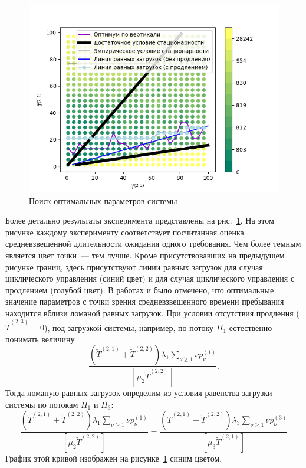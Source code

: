 \begin{figure}[h]
\centering
\includegraphics[scale=0.9]{Pictures/0_1_thres_10_target.png} 
\caption{Поиск оптимальных параметров системы}
\label{Experiment:targets}
\end{figure}


Более детально результаты эксперимента представлены на рис.~\ref{Experiment:targets}. На этом рисунке каждому эксперименту соответствует посчитанная оценка средневзвешенной длительности ожидания одного требования. Чем более темным является цвет точки~--- тем лучше. Кроме присутствовавших на предыдущем рисунке границ, здесь присутствуют линии равных загрузок для случая циклического управления (синий цвет) и для случая циклического управления с продлением (голубой цвет). В работах \cite{Fedotkin:2009} и \cite{FedotkinRachinskaya:2016} было отмечено, что оптимальные значение параметров с точки зрения средневзвешенного времени пребывания находится вблизи ломаной равных загрузок. При условии отсутствия продления ($\widetilde T^{(2,3)}=0$),  под загрузкой системы, например, по потоку $\Pi_1$ естественно понимать величину
\begin{equation}
\frac{(\widetilde T^{(2,1)} + \widetilde T^{(2,2)})\lambda_1 \sum_{\nu\geqslant 1}\nu p_{\nu}^{(1)}}{[\mu_2 \widetilde T^{(2,2)}]}.
\end{equation}
Тогда ломаную равных загрузок определим из условия равенства загрузки системы по потокам $\Pi_1$ и $\Pi_3$:
\begin{equation}
\frac{(\widetilde T^{(2,1)} +\widetilde T^{(2,2)})\lambda_1 \sum_{\nu\geqslant 1}\nu p_{\nu}^{(1)}}{[\mu_2 \widetilde T^{(2,2)}]}=
    \frac{(\widetilde T^{(2,1)} + \widetilde T^{(2,2)})\lambda_3 \sum_{\nu\geqslant 1}\nu p_{\nu}^{(3)}}{[\mu_3 \widetilde T^{(2,1)}]}
\end{equation}
График этой кривой изображен на рисунке~\ref{Experiment:targets} синим цветом. 

